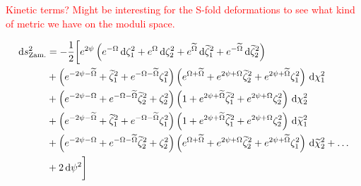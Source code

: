 \documentclass[a4paper, 11pt]{article}
\numberwithin{equation}{section}
\newcommand{\ts}[1]{\widetilde{#1}}
\newcommand{\+}{\oplus}
\renewcommand{\d}{\ensuremath{\mathrm{d}}\xspace}
\newcommand{\EM}[1]{\textcolor{red}{#1}}
\begin{document}
\EM{Kinetic terms? Might be interesting for the S-fold deformations to see what kind of metric we have on the moduli space.}

\begin{equation}
	\begin{aligned}
		\d s^{2}_{\rm Zam.} &= -\frac{1}{2}\bigg[e^{2\psi}\left(e^{-\Omega}\,\d\zeta_{1}^{2}+e^{\Omega}\,\d\zeta_{2}^{2}+e^{\ts{\Omega}}\,\d\ts{\zeta}_{1}^{2}+e^{-\ts{\Omega}}\,\d\ts{\zeta}_{2}^{2}\right) \\
		&+ \left(e^{-2\psi-\ts{\Omega}}+\ts{\zeta}_{1}^{2}+e^{-\Omega-\ts{\Omega}}\zeta_{1}^{2}\right)\left(e^{\Omega+\ts{\Omega}}+e^{2\psi+\Omega}\ts{\zeta}_{2}^{2}+e^{2\psi+\ts{\Omega}}\zeta_{1}^{2}\right) \,\d\chi_{1}^{2} \\
		&+ \left(e^{-2\psi-\Omega}+e^{-\Omega-\ts{\Omega}}\ts{\zeta}_{2}^{2}+\zeta_{2}^{2}\right)\left(1+e^{2\psi+\ts{\Omega}}\ts{\zeta}_{1}^{2}+e^{2\psi+\Omega}\zeta_{2}^{2}\right) \,\d\chi_{2}^{2}\\
		&+ \left(e^{-2\psi-\ts{\Omega}}+\ts{\zeta}_{1}^{2}+e^{-\Omega-\ts{\Omega}}\zeta_{1}^{2}\right)\left(1+e^{2\psi+\ts{\Omega}}\ts{\zeta}_{1}^{2}+e^{2\psi+\Omega}\zeta_{2}^{2}\right) \,\d\ts{\chi}_{1}^{2} \\
		&+ \left(e^{-2\psi-\Omega}+e^{-\Omega-\ts{\Omega}}\ts{\zeta}_{2}^{2}+\zeta_{2}^{2}\right)\left(e^{\Omega+\ts{\Omega}}+e^{2\psi+\Omega}\ts{\zeta}_{2}^{2}+e^{2\psi+\ts{\Omega}}\zeta_{1}^{2}\right) \,\d\ts{\chi}_{2}^{2} + \ldots \\
		&+2\,\d\psi^{2}\bigg]
	\end{aligned}
\end{equation}
\end{document}
